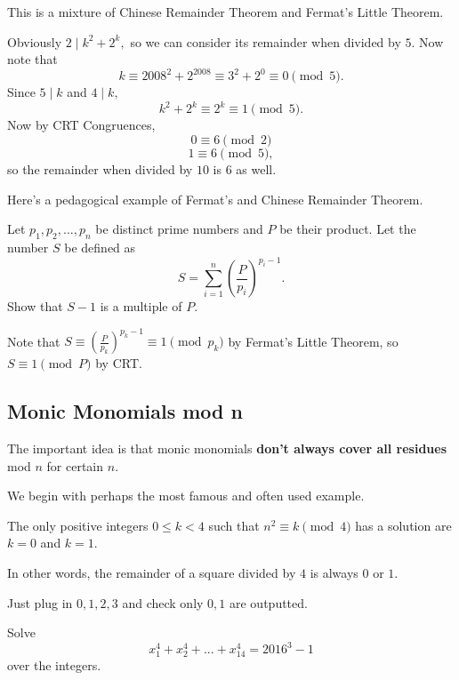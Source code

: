 \documentclass{article}
\begin{document}
\begin{sol}
This is a mixture of Chinese Remainder Theorem and Fermat's Little Theorem.

Obviously $2\mid k^2+2^k,$ so we can consider its remainder when divided by $5.$ Now note that
\[k\equiv {2008}^{2}+{2}^{2008}\equiv 3^2+2^0\equiv 0\pmod{5}.\]
Since $5\mid k$ and $4\mid k,$
\[k^2+2^k\equiv 2^k\equiv 1\pmod{5}.\]
Now by CRT Congruences,
\[0\equiv 6\pmod{2}\]
\[1\equiv 6\pmod{5},\]
so the remainder when divided by $10$ is $6$ as well.
\end{sol}

Here's a pedagogical example of Fermat's and Chinese Remainder Theorem.

\begin{exam}
Let $p_1,p_2,\ldots,p_n$ be distinct prime numbers and $P$ be their product. Let the number $S$ be defined as
\[S=\sum\limits_{i=1}^{n}\left(\frac{P}{p_i}\right)^{p_i-1}.\]
Show that $S-1$ is a multiple of $P.$
\end{exam}

\begin{sol}
Note that $S\equiv \left(\frac{P}{p_k}\right)^{p_k-1}\equiv 1\pmod{p_k}$ by Fermat's Little Theorem, so $S\equiv 1\pmod{P}$ by CRT.
\end{sol}

\subsection{Monic Monomials mod n}
The important idea is that monic monomials \textbf{don't always cover all residues} mod $n$ for certain $n.$

We begin with perhaps the most famous and often used example.

\begin{exam}
The only positive integers $0\leq k<4$ such that $n^2\equiv k\pmod{4}$ has a solution are $k=0$ and $k=1.$
\end{exam}

In other words, the remainder of a square divided by $4$ is always $0$ or $1.$

\begin{sol}
Just plug in $0,1,2,3$ and check only $0,1$ are outputted.
\end{sol}

\begin{exam}
Solve
\[x_{1}^4 + x_{2}^4 +...+ x_{14}^4=2016^3 - 1\]
over the integers.
\end{exam}
\end{document}
